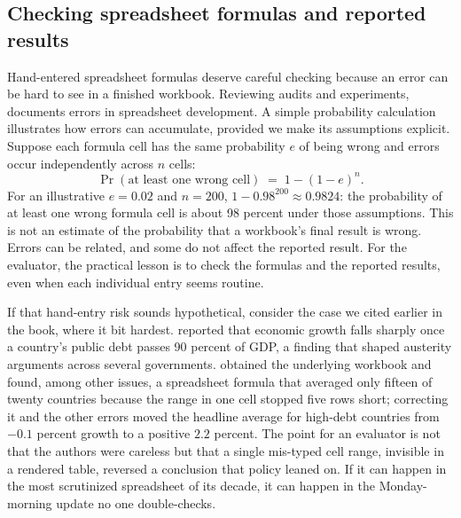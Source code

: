 \subsection{Checking spreadsheet formulas and reported results}\label{sec:ch11-spreadsheet-risk}
Hand-entered spreadsheet formulas deserve careful checking because an error can be hard to see in a finished workbook. Reviewing audits and experiments, \textcite{panko1998errors} documents errors in spreadsheet development. A simple probability calculation illustrates how errors can accumulate, provided we make its assumptions explicit. Suppose each formula cell has the same probability $e$ of being wrong and errors occur independently across $n$ cells:
\[
\Pr(\text{at least one wrong cell}) \;=\; 1-(1-e)^{n}.
\]
For an illustrative $e=0.02$ and $n=200$, $1-0.98^{200}\approx0.9824$: the probability of at least one wrong formula cell is about 98 percent under those assumptions. This is not an estimate of the probability that a workbook's final result is wrong. Errors can be related, and some do not affect the reported result. For the evaluator, the practical lesson is to check the formulas and the reported results, even when each individual entry seems routine.

If that hand-entry risk sounds hypothetical, consider the case we cited earlier in the book, where it bit hardest. \textcite{reinhart2010debt} reported that economic growth falls sharply once a country's public debt passes 90 percent of GDP, a finding that shaped austerity arguments across several governments. \textcite{herndon2014debt} obtained the underlying workbook and found, among other issues, a spreadsheet formula that averaged only fifteen of twenty countries because the range in one cell stopped five rows short; correcting it and the other errors moved the headline average for high-debt countries from $-0.1$ percent growth to a positive $2.2$ percent. The point for an evaluator is not that the authors were careless but that a single mis-typed cell range, invisible in a rendered table, reversed a conclusion that policy leaned on. If it can happen in the most scrutinized spreadsheet of its decade, it can happen in the Monday-morning update no one double-checks.

